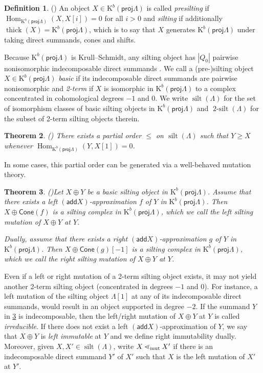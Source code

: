 \documentclass[11pt]{amsart}
\newcommand{\add}{\mathsf{add}}
\newcommand{\proj}{\mathsf{proj}}
\newcommand{\cone}{\mathsf{Cone}}
\newcommand{\K}{\mathrm{K}}
\DeclareMathOperator{\Hom}{\mathrm{Hom}}
\DeclareMathOperator{\thick}{\mathrm{thick}}
\DeclareMathOperator{\silt}{\mathrm{silt}}
\DeclareMathOperator{\twosilt}{\mathrm{2-silt}}
\newtheorem{theorem}{Theorem}[section]
\theoremstyle{definition}
\newtheorem{definition}[theorem]{Definition}
\begin{document}
\begin{definition}(\cite{Aihara_2012})
	An object $X \in \mathrm{K}^b(\proj \Lambda)$ is called \textit{presilting} if $\Hom_{\mathrm{K}^b(\proj \Lambda)}(X,X[i])= 0$ for all $i > 0$ and \textit{silting} if additionally $\thick(X) = \mathrm{K}^b(\proj \Lambda)$, which is to say that $X$ generates $\mathrm{K}^b(\proj \Lambda)$ under taking direct summands, cones and shifts.
\end{definition}

Because $ \mathrm{K}^b(\proj \Lambda)$ is Krull--Schmidt, any silting object has $|Q_0|$ pairwise nonisomorphic indecomposable direct summands \cite[Cor. 2.28]{Aihara_2012}. We call a (pre-)silting object $X \in \K^b(\proj \Lambda)$ \textit{basic} if its indecomposable direct summands are pairwise nonisomorphic and \textit{2-term} if $X$ is isomorphic in $\mathrm{K}^b(\proj \Lambda)$ to a complex concentrated in cohomological degrees $-1$ and $0$. We write $\silt (\Lambda)$ for the set of isomorphism classes of basic silting objects in $\mathrm{K}^b(\proj \Lambda)$ and $\twosilt (\Lambda)$ for the subset of 2-term silting objects therein. 

\begin{theorem}(\cite[Thm. 2.11]{Aihara_2012})
	There exists a partial order $\leq$ on $\silt (\Lambda )$ such that $Y \geq X$ whenever $\Hom_{\mathrm{K}^b(\proj \Lambda)}(Y, X[1]) = 0$. 
\end{theorem}

In some cases, this partial order can be generated via a well-behaved mutation theory.

\begin{theorem}(\cite[Def. 2.30, Thm. 2.31]{Aihara_2012})\label{thm:siltmutdefn}
    Let $X \oplus Y$ be a basic silting object in $\mathrm{K}^b(\proj \Lambda)$. Assume that there exists a left $(\add X)$-approximation $f$ of $Y$ in $\mathrm{K}^b(\proj \Lambda)$. Then $X \oplus \cone(f)$ is a silting complex in $\mathrm{K}^b(\proj \Lambda)$, which we call the \textit{left silting mutation} of $X \oplus Y$ at $Y$.
    
    Dually, assume that there exists a right $(\add X)$-approximation $g$ of $Y$ in $\mathrm{K}^b(\proj \Lambda)$. Then $X \oplus \cone(g)[-1]$ is a silting complex in $\mathrm{K}^b(\proj \Lambda)$, which we call the \textit{right silting mutation} of $X \oplus Y$ at $Y$. 
\end{theorem}

Even if a left or right mutation of a 2-term silting object exists, it may not yield another 2-term silting object (concentrated in degrees $-1$ and $0$). For instance, a left mutation of the silting object $\Lambda[1]$ at any of its indecomposable direct summands, would result in an object supported in degree $-2$. If the summand $Y$ in \cref{thm:siltmutdefn} is indecomposable, then the left/right mutation of $X \oplus Y$ at $Y$ is called \textit{irreducible}. If there does not exist a left $(\add X)$-approximation of $Y$, we say that $X \oplus Y$ is \textit{left immutable} at $Y$ and we define right immutability dually. Moreover, given $X,X' \in \silt (\Lambda)$, write $X \lessdot_{\textnormal{mut}} X'$ if there is an indecomposable direct summand $Y'$ of $X'$ such that $X$ is the left mutation of $X'$ at $Y'$. 
\end{document}
